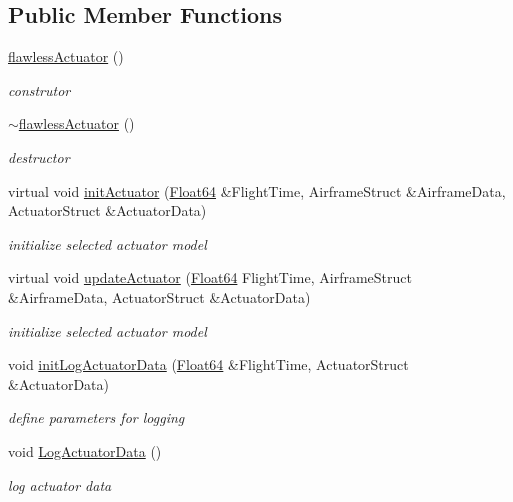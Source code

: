 \subsection*{Public Member Functions}
\begin{DoxyCompactItemize}
\item 
\hyperlink{classflawless_actuator_a73fc69c36971b5ffc8c9c7d135f1bb30}{flawless\+Actuator} ()
\begin{DoxyCompactList}\small\item\em construtor \end{DoxyCompactList}\item 
\hyperlink{classflawless_actuator_a3a37f5cff70fd61354dc25aa4bfe2466}{$\sim$flawless\+Actuator} ()
\begin{DoxyCompactList}\small\item\em destructor \end{DoxyCompactList}\item 
virtual void \hyperlink{classflawless_actuator_a8676b36d0dfd7c8d7d789bdd6135db8f}{init\+Actuator} (\hyperlink{group___tools_ga3f1431cb9f76da10f59246d1d743dc2c}{Float64} \&Flight\+Time, Airframe\+Struct \&Airframe\+Data, Actuator\+Struct \&Actuator\+Data)
\begin{DoxyCompactList}\small\item\em initialize selected actuator model \end{DoxyCompactList}\item 
virtual void \hyperlink{classflawless_actuator_ad025b033eb040a76cc7d4a7b85ad33da}{update\+Actuator} (\hyperlink{group___tools_ga3f1431cb9f76da10f59246d1d743dc2c}{Float64} Flight\+Time, Airframe\+Struct \&Airframe\+Data, Actuator\+Struct \&Actuator\+Data)
\begin{DoxyCompactList}\small\item\em initialize selected actuator model \end{DoxyCompactList}\item 
void \hyperlink{classflawless_actuator_a10b782f3ece4dff258a4914cdb08d273}{init\+Log\+Actuator\+Data} (\hyperlink{group___tools_ga3f1431cb9f76da10f59246d1d743dc2c}{Float64} \&Flight\+Time, Actuator\+Struct \&Actuator\+Data)
\begin{DoxyCompactList}\small\item\em define parameters for logging \end{DoxyCompactList}\item 
void \hyperlink{classflawless_actuator_a5cd61e149a795ba7db292101d4782bd5}{Log\+Actuator\+Data} ()
\begin{DoxyCompactList}\small\item\em log actuator data \end{DoxyCompactList}\end{DoxyCompactItemize}


